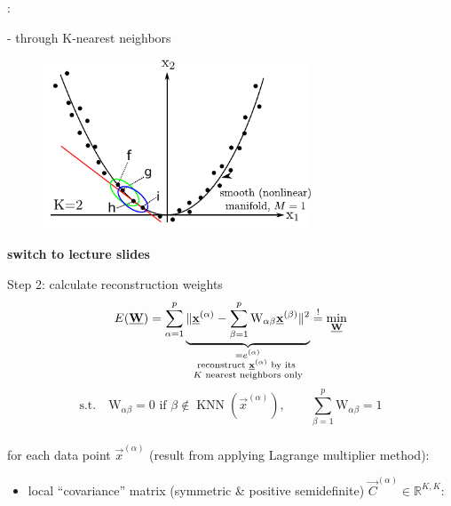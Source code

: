 \begin{frame}{\subsecname:~\subsubsecname}


\pause

- through K-nearest neighbors

\begin{figure}[ht]
	\centering
    \includegraphics[width=8cm]{img/section4_fig11_K2}
	\label{fig:tangentialk2}
\end{figure}

\end{frame}

\begin{frame}
\textbf{switch to lecture slides}

\end{frame}

\begin{frame}{Step 2: calculate reconstruction weights}
\begin{equation}
E(\underline{\mathbf{W}}) = \sum_{\alpha=1}^{p} \underbrace{\lVert\underline{\mathbf{x}}^{(\alpha)} - \sum_{\beta=1}^{p} \mathrm{W}_{\alpha \beta} \underline{\mathbf{x}}^{(\beta)}\rVert^2}_{
\substack{=e^{(\alpha)}\\\text{reconstruct } \underline{\mathbf{x}}^{(\alpha)} \text{ by its } \\ K \text{ nearest neighbors only}}
}
\stackrel{\mathrm{!}}{=} \min_{\underline{\mathbf{W}}}
\end{equation}
\begin{equation}
\text{s.t.} \quad \mathrm{W}_{\alpha \beta} = 0 \text{ if } \beta \notin \operatorname{KNN}(\vec{x}^{(\alpha)}), \qquad
\sum_{\beta=1}^{p} \mathrm{W}_{\alpha \beta} = 1
\end{equation}\\

for each data point $\vec{x}^{(\alpha)}$ (result from applying Lagrange multiplier method):
\begin{itemize}
	\item local ``covariance'' matrix (symmetric \& positive semidefinite) $\vec{C}^{(\alpha)} \in \mathbb{R}^{K,K}:$ 
\end{itemize}

\end{frame}

